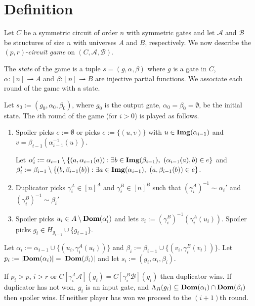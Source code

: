 \documentclass[../main/thesis.tex]{subfiles}
\begin{document}
\section{Definition}

Let $C$ be a symmetric circuit of order $n$ with symmetric gates and let
$\mathcal{A}$ and $\mathcal{B}$ be structures of size $n$ with universes $A$ and
$B$, respectively. We now describe the $(p,r)$-\emph{circuit game} on $(C,
\mathcal{A}, \mathcal{B})$.

The \emph{state} of the game is a tuple $s = (g, \alpha, \beta)$ where $g$ is a
gate in $C$, $\alpha : [n] \rightharpoonup A$ and $\beta: [n] \rightharpoonup B$
are injective partial functions. We associate each round of the game with a
state.

Let $s_0 := (g_0, \alpha_0, \beta_0)$, where $g_0$ is the output gate, $\alpha_0
= \beta_0 = \emptyset$, be the initial state. The $i$th round of the game (for $i
> 0$) is played as follows.

\begin{enumerate}
\item Spoiler picks $e := \emptyset$ or picks $e := \{(u, v)\}$ with $u \in
  \text{\textbf{Img}}(\alpha_{i-1})$ and $v = \beta_{i-1}(\alpha^{-1}_{i-1}(u))$.

  Let $\alpha_i' := \alpha_{i-1} \setminus \{(a, \alpha_{i-1}(a)) : \exists b
  \in \text{\textbf{Img}}(\beta_{i-1}) , \,\, (\alpha_{i-1}(a) , b) \in e\}$ and $\beta_i' :=
  \beta_{i-1} \setminus \{(b, \beta_{i-1}(b)) : \exists a \in \text{\textbf{Img}}(\alpha_{i-1})
  , \,\, (a,\beta_{i-1}(b)) \in e\}$.

\item Duplicator picks $\gamma^A_i \in [n]^{\underline{A}}$ and $\gamma^B_i \in
  [n]^{\underline{B}}$ such that $(\gamma^A_i)^{-1} \sim \alpha_i'$ and
  $(\gamma^B_i)^{-1} \sim \beta_i'$
\item Spoiler picks $u_i \in A \setminus \text{\textbf{Dom}}(\alpha_i')$ and lets $v_i :=
  (\gamma^B_i)^{-1}(\gamma^A_i(u_i))$. Spoiler picks $g_i \in H_{g_{i-1}} \cup
  \{g_{i-1}\}$.
\end{enumerate}

Let $\alpha_i := \alpha_{i-1} \cup \{(u_i, \gamma^{A}_i(u_i))\}$ and $\beta_i :=
\beta_{i-1} \cup \{(v_i, \gamma^{B}_i(v_i))\}$. Let $p_i := \vert \text{\textbf{Dom}}(\alpha_i)
\vert = \vert \text{\textbf{Dom}} (\beta_i)\vert$ and let $s_i := (g_i, \alpha_i, \beta_i)$.

If $p_i > p$, $i > r$ or $C[\gamma^A_i \mathcal{A}](g_i) = C[\gamma^B_i
\mathcal{B}](g_i)$ then duplicator wins. If duplicator has not won, $g_i$ is an
input gate, and $\Lambda_R(g_i) \subseteq \text{\textbf{Dom}}(\alpha_i) \cap \text{\textbf{Dom}}(\beta_i)$
then spoiler wins. If neither player has won we proceed to the $(i+1)$th round.
\end{document}
